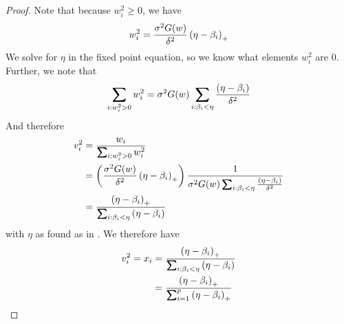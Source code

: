 \documentclass[12pt,leqno,letterpaper]{article}
\begin{document}
\begin{proof}
Note that because $w_i^2 \geq 0$, we have
\begin{align*}
w_i^2 = \frac{\sigma^2 G(w)}{\delta^2}\left(\eta - \beta_i\right)_+
\end{align*}
We solve for $\eta$ in the fixed point equation, so we know what elements $w_i^2$ are 0.  Further, we note that
\begin{align}
\sum_{i:w_i^2>0} w_i^2 = \gs^2G(w)\sum_{i:\gb_i<\eta} \frac{\paren{\eta-\gb_i}}{\gd^2}
\end{align}
And therefore
\begin{align}
v_i^2 &= \frac{w_i}{\sum_{i:w_i^2>0}w_i^2} \\
&= \paren{\frac{\gs^2 G(w)}{\gd^2}\paren{\eta-\gb_i}_+} \frac{1}{\gs^2G(w)\sum_{i:\gb_i<\eta} \frac{\paren{\eta-\gb_i}}{\gd^2}}\\
&= \frac{\paren{\eta-\gb_i}_+}{\sum_{i:\gb_i<\eta}\paren{\eta-\gb_i}}
\end{align}
with $\eta$ as found as in .
We therefore have
\begin{align}
v_i^2  = x_i &= \frac{\paren{\eta-\gb_i}_+}{\sum_{i: \gb_i<\eta} \paren{\eta-\gb_i}}\\
&= \frac{\paren{\eta-\gb_i}_+}{\sum_{i=1}^p \paren{\eta-\gb_i}_+}
\end{align}

\end{proof}
\end{document}
